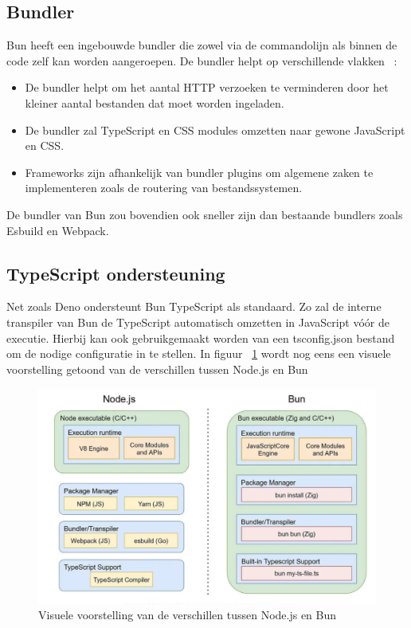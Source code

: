 \subsection{Bundler}
Bun heeft een ingebouwde bundler die zowel via de commandolijn als binnen de code zelf kan worden aangeroepen. 
De bundler helpt op verschillende vlakken ~\autocite{McDonnel2023}:
\begin{itemize}
    \item De bundler helpt om het aantal HTTP verzoeken te verminderen door het kleiner aantal bestanden dat moet worden ingeladen.
    \item De bundler zal TypeScript en CSS modules omzetten naar gewone JavaScript en CSS. 
    \item Frameworks zijn afhankelijk van bundler plugins om algemene zaken te implementeren zoals de routering van bestandssystemen.
\end{itemize}
De bundler van Bun zou bovendien ook sneller zijn dan bestaande bundlers zoals Esbuild en Webpack.

\subsection{TypeScript ondersteuning}
Net zoals Deno ondersteunt Bun TypeScript als standaard. 
Zo zal de interne transpiler van Bun de TypeScript automatisch omzetten in JavaScript vóór de executie.
Hierbij kan ook gebruikgemaakt worden van een tsconfig.json bestand om de nodige configuratie in te stellen.
In figuur ~\ref{fig:nodevbun} wordt nog eens een visuele voorstelling getoond van de verschillen tussen Node.js en Bun

\begin{figure}[H]
    \centering
    \includegraphics[width=.9\textwidth]{graphics/nodevbun.png}
    \caption[Verschillen Node.js en Bun]{\label{fig:nodevbun}Visuele voorstelling van de verschillen tussen Node.js en Bun ~\autocite{Aghdasi2023}}
\end{figure}

